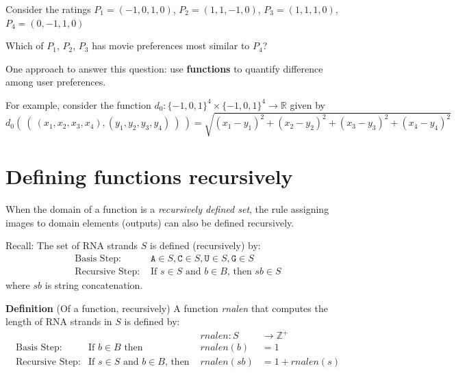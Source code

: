 \documentclass[12pt, oneside]{article}
\newcommand{\A}[0]{\texttt{A}}
\newcommand{\C}[0]{\texttt{C}}
\newcommand{\G}[0]{\texttt{G}}
\newcommand{\U}[0]{\texttt{U}}
\newcommand{\cmark}{\ding{51}}
\newcommand{\xmark}{\ding{55}}
\begin{document}
Consider the ratings $P_1 = (-1, 0, 1, 0)$, $P_2 = (1, 1, -1, 0)$, $P_3 = (1, 1, 1, 0)$,
$P_4 = (0,-1,1, 0)$


Which of $P_1$, $P_2$, $P_3$ has movie preferences most similar to $P_4$?

One approach to answer this question: use {\bf functions} to quantify difference among user preferences.

For example, consider the function 
$d_0: \{-1,0,1\}^4 \times \{-1,0,1\}^4 \to \mathbb{R}$
given by
\[
d_0 (~(~ (x_1, x_2, x_3, x_4), (y_1, y_2, y_3, y_4) ~) ~) = \sqrt{ (x_1 - y_1)^2 + (x_2 - y_2)^2 + (x_3 -y_3)^2 + (x_4 -y_4)^2}
\]


\vfill
\vfill

\newpage \vfill
\section*{Defining functions recursively}


When the domain of a function is a {\it recursively defined set}, the rule assigning 
images to domain elements (outputs) can also be defined recursively.

Recall: The set of RNA strands $S$ is defined (recursively) by:
\[
\begin{array}{ll}
\textrm{Basis Step: } & \A \in S, \C \in S, \U \in S, \G \in S \\
\textrm{Recursive Step: } & \textrm{If } s \in S\textrm{ and }b \in B \textrm{, then }sb \in S
\end{array}
\]
where $sb$ is string concatenation.

{\bf Definition} (Of a function, recursively) A function \textit{rnalen} that computes the length of RNA strands in $S$ is defined by:
\[
\begin{array}{llll}
& & \textit{rnalen} : S & \to \mathbb{Z}^+ \\
\textrm{Basis Step:} & \textrm{If } b \in B\textrm{ then } & \textit{rnalen}(b) & = 1 \\
\textrm{Recursive Step:} & \textrm{If } s \in S\textrm{ and }b \in B\textrm{, then  } & \textit{rnalen}(sb) & = 1 + \textit{rnalen}(s)
\end{array}
\]
\end{document}
